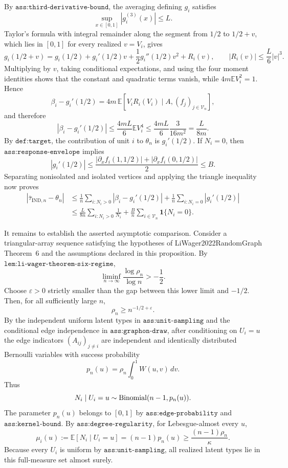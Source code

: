 By \(\texttt{ass:third-derivative-bound}\), the averaging defining \(g_i\) satisfies
\[
\sup_{x\in[0,1]}|g_i^{(3)}(x)|\le L.
\]
Taylor's formula with integral remainder along the segment from \(1/2\) to \(1/2+v\), which lies in \([0,1]\) for every realized \(v=V_i\), gives
\[
g_i(1/2+v)
=g_i(1/2)+g_i'(1/2)v+\frac12g_i''(1/2)v^2+R_i(v),
\qquad
|R_i(v)|\le\frac L6|v|^3.
\]
Multiplying by \(v\), taking conditional expectations, and using the four moment identities shows that the constant and quadratic terms vanish, while \(4m\mathbb E V_i^2=1\).  Hence
\[
\beta_i-g_i'(1/2)
=4m\,\mathbb E\!\left[V_iR_i(V_i)\mid A,(f_j)_{j\in\mathcal V_n}\right],
\]
and therefore
\[
|\beta_i-g_i'(1/2)|
\le \frac{4mL}{6}\mathbb E V_i^4
\le \frac{4mL}{6}\frac3{16m^2}
=\frac{L}{8m}.
\]
By \(\texttt{def:target}\), the contribution of unit \(i\) to \(\theta_n\) is \(g_i'(1/2)\).  If \(N_i=0\), then \(\texttt{ass:response-envelope}\) implies
\[
|g_i'(1/2)|
\le\frac{|\partial_x f_i(1,1/2)|+|\partial_x f_i(0,1/2)|}{2}
\le B.
\]
Separating nonisolated and isolated vertices and applying the triangle inequality now proves
\[
\begin{aligned}
|\bar\tau_{\mathrm{IND},n}-\theta_n|
&\le \frac1n\sum_{i:N_i>0}|\beta_i-g_i'(1/2)|
+\frac1n\sum_{i:N_i=0}|g_i'(1/2)|\\
&\le \frac{L}{8n}\sum_{i:N_i>0}\frac1{N_i}
+\frac Bn\sum_{i\in\mathcal V_n}\mathbf1\{N_i=0\}.
\end{aligned}
\]

It remains to establish the asserted asymptotic comparison.  Consider a triangular-array sequence satisfying the hypotheses of LiWager2022RandomGraph Theorem~6 and the assumptions declared in this proposition.  By \(\texttt{lem:li-wager-theorem-six-regime}\),
\[
\liminf_{n\to\infty}\frac{\log\rho_n}{\log n}>-\frac12.
\]
Choose \(\varepsilon>0\) strictly smaller than the gap between this lower limit and \(-1/2\).  Then, for all sufficiently large \(n\),
\[
\rho_n\ge n^{-1/2+\varepsilon}.
\]
By the independent uniform latent types in \(\texttt{ass:unit-sampling}\) and the conditional edge independence in \(\texttt{ass:graphon-draw}\), after conditioning on \(U_i=u\) the edge indicators \((A_{ij})_{j\ne i}\) are independent and identically distributed Bernoulli variables with success probability
\[
p_n(u)=\rho_n\int_0^1W(u,v)\,dv.
\]
Thus
\[
N_i\mid U_i=u\sim {\rm Binomial}(n-1,p_n(u)).
\]
The parameter \(p_n(u)\) belongs to \([0,1]\) by \(\texttt{ass:edge-probability}\) and \(\texttt{ass:kernel-bound}\).  By \(\texttt{ass:degree-regularity}\), for Lebesgue-almost every \(u\),
\[
\mu_i(u):=\mathbb E[N_i\mid U_i=u]
=(n-1)p_n(u)
\ge\frac{(n-1)\rho_n}{\kappa}.
\]
Because every \(U_i\) is uniform by \(\texttt{ass:unit-sampling}\), all realized latent types lie in this full-measure set almost surely.

